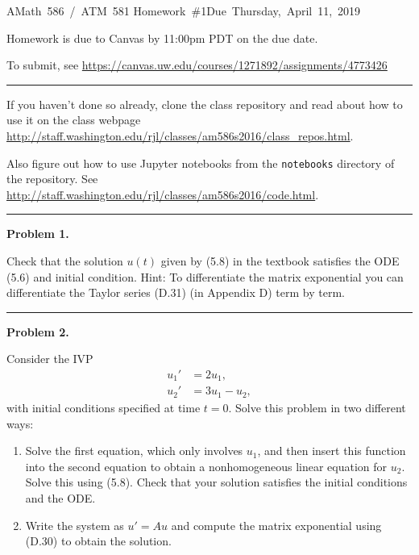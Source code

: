 \documentclass[10pt]{article}
\begin{document}
\hfill\vbox{\hbox{AMath 586 / ATM 581}
\hbox{Homework \#1}\hbox{Due Thursday, April 11, 2019}}

\vskip 5pt

Homework is due to Canvas by 11:00pm PDT on the due date.

To submit, see
\url{https://canvas.uw.edu/courses/1271892/assignments/4773426}


\vskip 1cm
\hrule

If you haven't done so already, clone the class repository and read about how 
to use it on the class webpage
\url{http://staff.washington.edu/rjl/classes/am586s2016/class_repos.html}.

Also figure out how to use Jupyter notebooks from the {\tt notebooks} directory
of the repository.  See 
\url{http://staff.washington.edu/rjl/classes/am586s2016/code.html}.



\vskip 1cm
\hrule
{\bf Problem 1.}

Check that the solution $u(t)$ given by (5.8) in the textbook
satisfies the ODE (5.6) and
initial condition.  Hint: To differentiate the matrix exponential you can
differentiate the Taylor series (D.31) (in Appendix D) term by term.



\vskip 1cm
\hrule
{\bf Problem 2.}


Consider the IVP
\begin{equation*}
\begin{split}
u_1' &= 2u_1,\\
u_2' &= 3u_1 - u_2,
\end{split}
\end{equation*}
with initial conditions specified at time $t=0$.  Solve this problem in two
different ways:

\begin{enumerate}
\item Solve the first equation, which only involves $u_1$, and then insert
this function into the second equation to obtain a nonhomogeneous linear
equation for $u_2$.  Solve this using (5.8).  
Check that your solution satisfies the initial conditions and the ODE.

\item Write the system as $u' = Au$ and compute the matrix exponential using
(D.30) to obtain the solution.
\end{enumerate}
\end{document}
